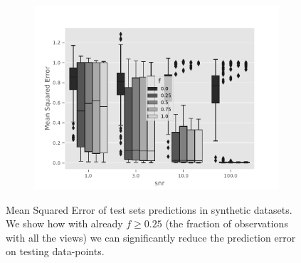 \begin{figure}[htb]
\centering
\begin{subfigure}{.49\textwidth}
	\centering
        \includegraphics[width=\textwidth]{./tex/fig/mar_pred_err_boxplot.pdf}
\end{subfigure}%
\caption{
Mean Squared Error of test sets predictions in synthetic datasets.
We show how with already $f \geq 0.25$ (the fraction of observations with all the views) we can significantly reduce the prediction error on testing data-points.
}
\label{fig:synthetic_benchmark_pred_box}
\end{figure}


